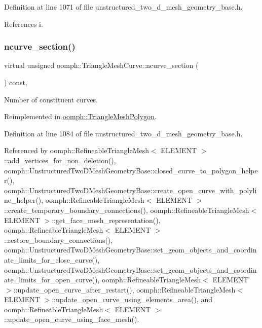 Definition at line 1071 of file unstructured\+\_\+two\+\_\+d\+\_\+mesh\+\_\+geometry\+\_\+base.\+h.



References i.

\mbox{\label{classoomph_1_1TriangleMeshCurve_af0b316414dd4a848b8bdfe314e5200ea}} 
\subsubsection{\texorpdfstring{ncurve\+\_\+section()}{ncurve\_section()}}
{\footnotesize\ttfamily virtual unsigned oomph\+::\+Triangle\+Mesh\+Curve\+::ncurve\+\_\+section (\begin{DoxyParamCaption}{ }\end{DoxyParamCaption}) const\hspace{0.3cm}{\ttfamily [inline]}, {\ttfamily [virtual]}}



Number of constituent curves. 



Reimplemented in \hyperlink{classoomph_1_1TriangleMeshPolygon_a6ef43be1b982a8dcc2f10545ab251bdb}{oomph\+::\+Triangle\+Mesh\+Polygon}.



Definition at line 1084 of file unstructured\+\_\+two\+\_\+d\+\_\+mesh\+\_\+geometry\+\_\+base.\+h.



Referenced by oomph\+::\+Refineable\+Triangle\+Mesh$<$ E\+L\+E\+M\+E\+N\+T $>$\+::add\+\_\+vertices\+\_\+for\+\_\+non\+\_\+deletion(), oomph\+::\+Unstructured\+Two\+D\+Mesh\+Geometry\+Base\+::closed\+\_\+curve\+\_\+to\+\_\+polygon\+\_\+helper(), oomph\+::\+Unstructured\+Two\+D\+Mesh\+Geometry\+Base\+::create\+\_\+open\+\_\+curve\+\_\+with\+\_\+polyline\+\_\+helper(), oomph\+::\+Refineable\+Triangle\+Mesh$<$ E\+L\+E\+M\+E\+N\+T $>$\+::create\+\_\+temporary\+\_\+boundary\+\_\+connections(), oomph\+::\+Refineable\+Triangle\+Mesh$<$ E\+L\+E\+M\+E\+N\+T $>$\+::get\+\_\+face\+\_\+mesh\+\_\+representation(), oomph\+::\+Refineable\+Triangle\+Mesh$<$ E\+L\+E\+M\+E\+N\+T $>$\+::restore\+\_\+boundary\+\_\+connections(), oomph\+::\+Unstructured\+Two\+D\+Mesh\+Geometry\+Base\+::set\+\_\+geom\+\_\+objects\+\_\+and\+\_\+coordinate\+\_\+limits\+\_\+for\+\_\+close\+\_\+curve(), oomph\+::\+Unstructured\+Two\+D\+Mesh\+Geometry\+Base\+::set\+\_\+geom\+\_\+objects\+\_\+and\+\_\+coordinate\+\_\+limits\+\_\+for\+\_\+open\+\_\+curve(), oomph\+::\+Refineable\+Triangle\+Mesh$<$ E\+L\+E\+M\+E\+N\+T $>$\+::update\+\_\+open\+\_\+curve\+\_\+after\+\_\+restart(), oomph\+::\+Refineable\+Triangle\+Mesh$<$ E\+L\+E\+M\+E\+N\+T $>$\+::update\+\_\+open\+\_\+curve\+\_\+using\+\_\+elements\+\_\+area(), and oomph\+::\+Refineable\+Triangle\+Mesh$<$ E\+L\+E\+M\+E\+N\+T $>$\+::update\+\_\+open\+\_\+curve\+\_\+using\+\_\+face\+\_\+mesh().

